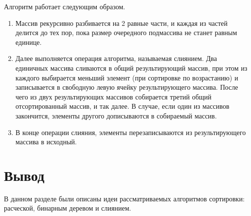 Алгоритм работает следующим образом.
\begin{enumerate}[label=\arabic*)]
	\item Массив рекурсивно разбивается на 2 равные части, и каждая из частей делится до тех пор, пока размер очередного подмассива не станет равным единице.	
	\item Далее выполняется операция алгоритма, называемая слиянием. Два единичных массива сливаются в общий результирующий массив, при этом из каждого выбирается меньший элемент (при сортировке по возрастанию) и записывается в свободную левую ячейку результирующего массива. После чего из двух результирующих массивов собирается третий общий отсортированный массив, и так далее. В случае, если один из массивов закончится, элементы другого дописываются в собираемый массив.	
	\item В конце операции слияния, элементы перезаписываются из результирующего массива в исходный.
\end{enumerate}


\section*{Вывод}
В данном разделе были описаны идеи рассматриваемых алгоритмов сортировки: расческой, бинарным деревом и слиянием.